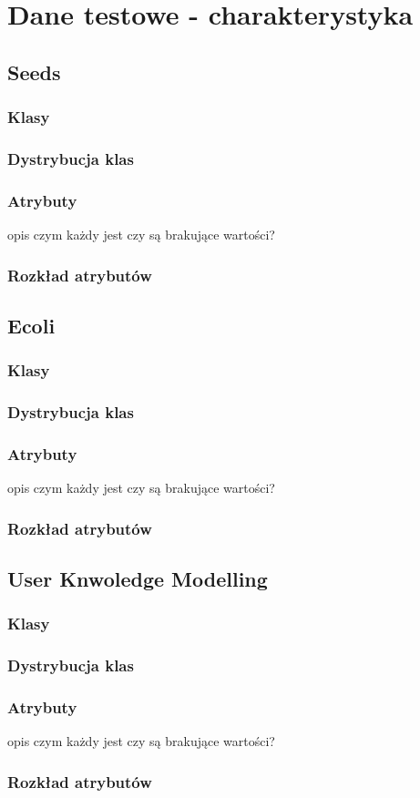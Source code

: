 \chapter{Dane testowe - charakterystyka}

\section{Seeds}
	\subsection{Klasy}

	\subsection{Dystrybucja klas}
		
	\subsection{Atrybuty}
opis czym każdy jest
czy są brakujące wartości?
	\subsection{Rozkład atrybutów}

\section{Ecoli}
	\subsection{Klasy}

	\subsection{Dystrybucja klas}
		
	\subsection{Atrybuty}
opis czym każdy jest
czy są brakujące wartości?
	\subsection{Rozkład atrybutów}



\section{User Knwoledge Modelling}
	\subsection{Klasy}

	\subsection{Dystrybucja klas}
		
	\subsection{Atrybuty}
opis czym każdy jest
czy są brakujące wartości?
	\subsection{Rozkład atrybutów}
